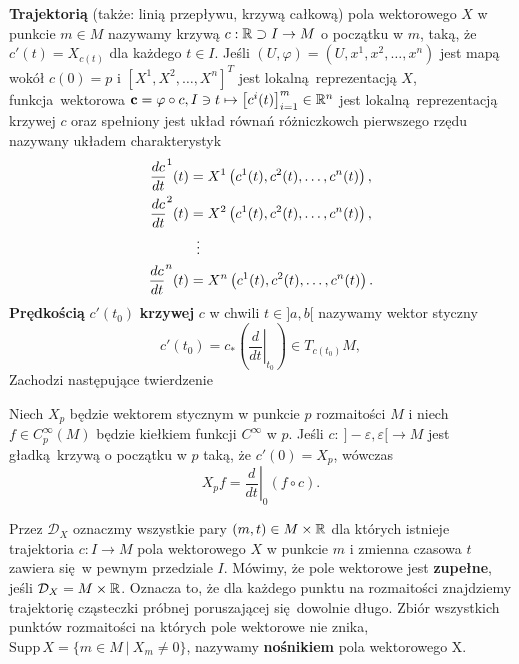 \textbf{Trajektorią} (także: linią przepływu, krzywą całkową) pola wektorowego \(X\) w punkcie \(m\in M\) nazywamy krzywą \(c: \mathbb{R} \supset I \rightarrow M\) o początku w \(m\), taką, że \(c'(t) = X_{c(t)}\) dla każdego \(t\in I\). Jeśli \((U, \varphi) = (U, x^1, x^2, \dots, x^n)\) jest mapą wokół \(c(0)=p\) i \([X^1, X^2, \dots, X^n]^T\) jest lokalną reprezentacją \(X\), funkcja wektorowa \(\mathbf{c} = \varphi \circ c, I \ni t \mapsto \left[c^i(t)\right]_{i=1}^m \in \mathbb{R}^n\) jest lokalną reprezentacją krzywej \(c\) oraz spełniony jest układ równań różniczkowch pierwszego rzędu nazywany układem charakterystyk
\begin{align*}
    \frac{dc}{dt}^1(t) &= X^1\left(c^1(t), c^2(t), \dots, c^n(t)\right),\\
    \frac{dc}{dt}^2(t) &= X^2\left(c^1(t), c^2(t), \dots, c^n(t)\right),\\
    &\mathrel{\makebox[\widthof{=}]{\vdots}}  \\
    \frac{dc}{dt}^n(t) &= X^n\left(c^1(t), c^2(t), \dots, c^n(t)\right).
\end{align*}
\textbf{Prędkością} \(c'(t_0)\) \textbf{krzywej} \(c\) w chwili \(t\in]a, b[\) nazywamy wektor styczny
\begin{equation}
c'(t_0) = c_\ast\left(\left.\frac{d}{dt}\right|_{t_0}\right)\in T_{c(t_0)}M,
\end{equation}
Zachodzi następujące twierdzenie
\begin{twierdzenie}
Niech \(X_p\) będzie wektorem stycznym w punkcie \(p\) rozmaitości \(M\) i niech \(f\in C_p^\infty(M)\) będzie kiełkiem funkcji \(C^\infty\) w \(p\). Jeśli \(c:\:]-\varepsilon,\varepsilon[\rightarrow M\) jest gładką krzywą o początku w \(p\) taką, że \(c'(0)=X_p\), wówczas
\begin{equation}
X_pf=\left.\frac{d}{dt}\right|_0(f\circ c).
\end{equation}
\end{twierdzenie}
Przez \(\mathcal{D}_X\) oznaczmy wszystkie pary \((m, t)\in M \times \mathbb{R}\) dla których istnieje trajektoria \(c: I\rightarrow M\) pola wektorowego \(X\) w punkcie \(m\) i zmienna czasowa \(t\) zawiera się w pewnym przedziale \(I\). Mówimy, że pole wektorowe jest \textbf{zupełne}, jeśli \(\mathcal{D}_X = M \times \mathbb{R}\). Oznacza to, że dla każdego punktu na rozmaitości znajdziemy trajektorię cząsteczki próbnej poruszającej się dowolnie długo. Zbiór wszystkich punktów rozmaitości na których pole wektorowe nie znika, \(\mathrm{Supp}\,X=\{m\in M\:|\: X_m\neq 0\}\), nazywamy \textbf{nośnikiem} pola wektorowego X. 

